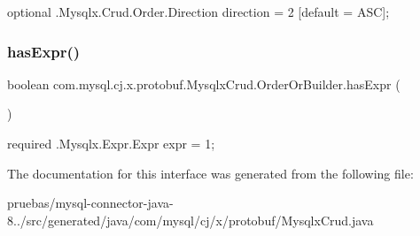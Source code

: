 {\ttfamily optional .Mysqlx.\+Crud.\+Order.\+Direction direction = 2 \mbox{[}default = A\+SC\mbox{]};} \mbox{\label{interfacecom_1_1mysql_1_1cj_1_1x_1_1protobuf_1_1_mysqlx_crud_1_1_order_or_builder_a2b5f18b18a73c655dac716f4d5c0efd7}} 
\subsubsection{\texorpdfstring{has\+Expr()}{hasExpr()}}
{\footnotesize\ttfamily boolean com.\+mysql.\+cj.\+x.\+protobuf.\+Mysqlx\+Crud.\+Order\+Or\+Builder.\+has\+Expr (\begin{DoxyParamCaption}{ }\end{DoxyParamCaption})}

{\ttfamily required .Mysqlx.\+Expr.\+Expr expr = 1;} 

The documentation for this interface was generated from the following file\+:\begin{DoxyCompactItemize}
\item 
pruebas/mysql-\/connector-\/java-\/8../src/generated/java/com/mysql/cj/x/protobuf/Mysqlx\+Crud.\+java\end{DoxyCompactItemize}
